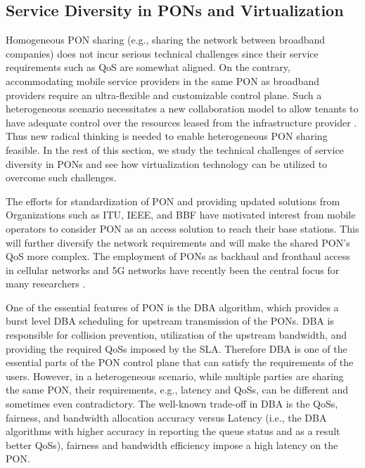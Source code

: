 \subsection{Service Diversity in \acp{PON} and Virtualization}

Homogeneous \ac{PON} sharing (e.g., sharing the network between broadband companies) does not incur serious technical challenges since their service requirements such as \ac{QoS} are somewhat aligned. %
On the contrary, accommodating mobile service providers in the same \ac{PON} as broadband providers require an ultra-flexible and customizable control plane. Such a heterogeneous scenario necessitates a new collaboration model to allow tenants to have adequate control over the resources leased from the infrastructure provider \cite{Cornaglia20152}. Thus new radical thinking is needed to enable heterogeneous \ac{PON} sharing feasible. In the rest of this section, we study the technical challenges of service diversity in \acp{PON} and see how virtualization technology can be utilized to overcome such challenges.

The efforts for standardization of \ac{PON} and providing updated solutions from Organizations such as \ac{ITU}, \ac{IEEE}, and \ac{BBF} have motivated interest from mobile operators to consider \ac{PON} as an access solution to reach their base stations. This will further diversify the network requirements and will make the shared \ac{PON}'s \ac{QoS} more complex. The employment of \acp{PON} as backhaul and fronthaul access in cellular networks and \ac{5G} networks have recently been the central focus for many researchers \cite{7121508,Fiorani2015}.


One of the essential features of \ac{PON} is the \ac{DBA} algorithm, which provides a burst level \ac{DBA} scheduling for upstream transmission of the \acp{PON}. \ac{DBA} is responsible for collision prevention, utilization of the upstream bandwidth, and providing the required \acp{QoS} imposed by the \ac{SLA}. Therefore \ac{DBA} is one of the essential parts of the \ac{PON} control plane that can satisfy the requirements of the users. However, in a heterogeneous scenario, while multiple parties are sharing the same \ac{PON}, their requirements, e.g., latency and \acp{QoS}, can be different and sometimes even contradictory. The well-known trade-off in \ac{DBA} is the \acp{QoS}, fairness, and bandwidth allocation accuracy versus Latency (i.e., the \ac{DBA} algorithms with higher accuracy in reporting the queue status and as a result better \acp{QoS}), fairness and bandwidth efficiency impose a high latency on the \ac{PON}. 


